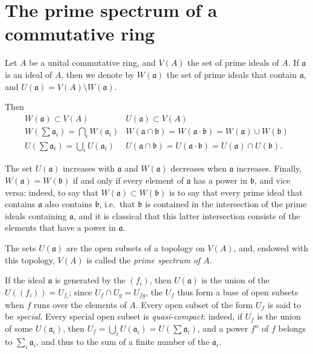 \documentclass[british]{article}
\begin{document}
\section{The prime spectrum of a commutative ring}\label{section-2}

Let \(A\) be a unital commutative ring, and \(V(A)\) the set of prime
ideals of \(A\). If \(\mathfrak{a}\) is an ideal of \(A\), then we
denote by \(W(\mathfrak{a})\) the set of prime ideals that contain
\(\mathfrak{a}\), and \(U(\mathfrak{a})=V(A)\setminus W(\mathfrak{a})\).

Then \[
  \begin{array}{cc}
    W(\mathfrak{a}) \subset V(A)
    & U(\mathfrak{a})\subset V(A)
  \\W\left(\sum\mathfrak{a}_i\right) = \bigcap_i W(\mathfrak{a}_i)
    & W(\mathfrak{a}\cap\mathfrak{b}) = W(\mathfrak{a}\cdot\mathfrak{b}) = W(\mathfrak{a})\cup W(\mathfrak{b})
  \\U\left(\sum\mathfrak{a}_i\right) = \bigcup_i U(\mathfrak{a}_i)
    & U(\mathfrak{a}\cap\mathfrak{b}) = U(\mathfrak{a}\cdot\mathfrak{b}) = U(\mathfrak{a})\cap U(\mathfrak{b}).
  \end{array}
\]

The set \(U(\mathfrak{a})\) increases with \(\mathfrak{a}\) and
\(W(\mathfrak{a})\) decreases when \(\mathfrak{a}\) increases. Finally,
\(W(\mathfrak{a})=W(\mathfrak{b})\) if and only if every element of
\(\mathfrak{a}\) has a power in \(\mathfrak{b}\), and vice versa:
indeed, to say that \(W(\mathfrak{a})\subset W(\mathfrak{b})\) is to say
that every prime ideal that contains \(\mathfrak{a}\) also contains
\(\mathfrak{b}\), i.e.~that \(\mathfrak{b}\) is contained in the
intersection of the prime ideals containing \(\mathfrak{a}\), and it is
classical that this latter intersection consists of the elements that
have a power in \(\mathfrak{a}\).

The sets \(U(\mathfrak{a})\) are the open subsets of a topology on
\(V(A)\), and, endowed with this topology, \(V(A)\) is called the
\emph{prime spectrum of \(A\)}.

If the ideal \(\mathfrak{a}\) is generated by the \((f_i)\), then
\(U(\mathfrak{a})\) is the union of the \(U((f_i))=U_{f_i}\); since
\(U_f\cap U_g=U_{fg}\), the \(U_f\) thus form a base of open subsets
when \(f\) runs over the elements of \(A\). Every open subset of the
form \(U_f\) is said to be \emph{special}. Every special open subset is
\emph{quasi-compact}: indeed, if \(U_f\) is the union of some
\(U(\mathfrak{a}_i)\), then
\(U_f=\bigcup_i U(\mathfrak{a}_i)=U(\sum\mathfrak{a}_i)\), and a power
\(f^n\) of \(f\) belongs to \(\sum_i\mathfrak{a}_i\), and thus to the
sum of a finite number of the \(\mathfrak{a}_i\).
\end{document}
